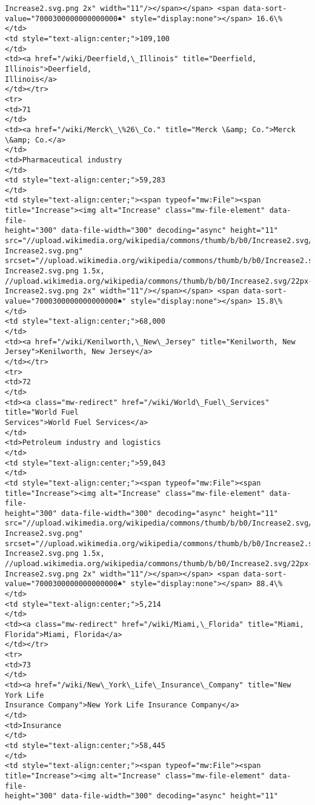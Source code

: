 \documentclass[11pt]{article}
\begin{document}
\begin{Verbatim}[commandchars=\\\{\}]
Increase2.svg.png 2x" width="11"/></span></span> <span data-sort-
value="7000300000000000000♠" style="display:none"></span> 16.6\%
</td>
<td style="text-align:center;">109,100
</td>
<td><a href="/wiki/Deerfield,\_Illinois" title="Deerfield, Illinois">Deerfield,
Illinois</a>
</td></tr>
<tr>
<td>71
</td>
<td><a href="/wiki/Merck\_\%26\_Co." title="Merck \&amp; Co.">Merck \&amp; Co.</a>
</td>
<td>Pharmaceutical industry
</td>
<td style="text-align:center;">59,283
</td>
<td style="text-align:center;"><span typeof="mw:File"><span
title="Increase"><img alt="Increase" class="mw-file-element" data-file-
height="300" data-file-width="300" decoding="async" height="11"
src="//upload.wikimedia.org/wikipedia/commons/thumb/b/b0/Increase2.svg/11px-
Increase2.svg.png"
srcset="//upload.wikimedia.org/wikipedia/commons/thumb/b/b0/Increase2.svg/17px-
Increase2.svg.png 1.5x,
//upload.wikimedia.org/wikipedia/commons/thumb/b/b0/Increase2.svg/22px-
Increase2.svg.png 2x" width="11"/></span></span> <span data-sort-
value="7000300000000000000♠" style="display:none"></span> 15.8\%
</td>
<td style="text-align:center;">68,000
</td>
<td><a href="/wiki/Kenilworth,\_New\_Jersey" title="Kenilworth, New
Jersey">Kenilworth, New Jersey</a>
</td></tr>
<tr>
<td>72
</td>
<td><a class="mw-redirect" href="/wiki/World\_Fuel\_Services" title="World Fuel
Services">World Fuel Services</a>
</td>
<td>Petroleum industry and logistics
</td>
<td style="text-align:center;">59,043
</td>
<td style="text-align:center;"><span typeof="mw:File"><span
title="Increase"><img alt="Increase" class="mw-file-element" data-file-
height="300" data-file-width="300" decoding="async" height="11"
src="//upload.wikimedia.org/wikipedia/commons/thumb/b/b0/Increase2.svg/11px-
Increase2.svg.png"
srcset="//upload.wikimedia.org/wikipedia/commons/thumb/b/b0/Increase2.svg/17px-
Increase2.svg.png 1.5x,
//upload.wikimedia.org/wikipedia/commons/thumb/b/b0/Increase2.svg/22px-
Increase2.svg.png 2x" width="11"/></span></span> <span data-sort-
value="7000300000000000000♠" style="display:none"></span> 88.4\%
</td>
<td style="text-align:center;">5,214
</td>
<td><a class="mw-redirect" href="/wiki/Miami,\_Florida" title="Miami,
Florida">Miami, Florida</a>
</td></tr>
<tr>
<td>73
</td>
<td><a href="/wiki/New\_York\_Life\_Insurance\_Company" title="New York Life
Insurance Company">New York Life Insurance Company</a>
</td>
<td>Insurance
</td>
<td style="text-align:center;">58,445
</td>
<td style="text-align:center;"><span typeof="mw:File"><span
title="Increase"><img alt="Increase" class="mw-file-element" data-file-
height="300" data-file-width="300" decoding="async" height="11"

\end{Verbatim}
\end{document}
